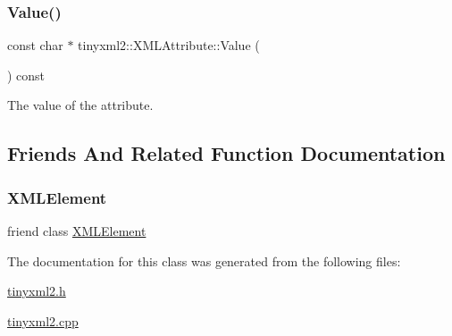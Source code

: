\subsubsection{\texorpdfstring{Value()}{Value()}}
{\footnotesize\ttfamily const char $\ast$ tinyxml2\+::\+X\+M\+L\+Attribute\+::\+Value (\begin{DoxyParamCaption}{ }\end{DoxyParamCaption}) const}



The value of the attribute. 



\subsection{Friends And Related Function Documentation}
\mbox{\label{classtinyxml2_1_1_x_m_l_attribute_ac2fba9b6e452829dd892f7392c24e0eb}} 
\subsubsection{\texorpdfstring{X\+M\+L\+Element}{XMLElement}}
{\footnotesize\ttfamily friend class \hyperlink{classtinyxml2_1_1_x_m_l_element}{X\+M\+L\+Element}\hspace{0.3cm}{\ttfamily [friend]}}



The documentation for this class was generated from the following files\+:\begin{DoxyCompactItemize}
\item 
\hyperlink{tinyxml2_8h}{tinyxml2.\+h}\item 
\hyperlink{tinyxml2_8cpp}{tinyxml2.\+cpp}\end{DoxyCompactItemize}

